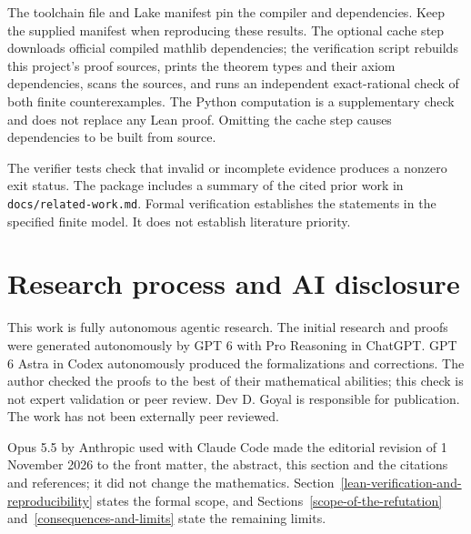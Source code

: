\documentclass[
  american,
  11pt,
]{article}
\begin{document}
The toolchain file and Lake manifest pin the compiler and dependencies.
Keep the supplied manifest when reproducing these results. The optional
cache step downloads official compiled mathlib dependencies; the
verification script rebuilds this project's proof sources, prints the
theorem types and their axiom dependencies, scans the sources, and runs
an independent exact-rational check of both finite counterexamples. The
Python computation is a supplementary check and does not replace any
Lean proof. Omitting the cache step causes dependencies to be built from
source.

The verifier tests check that invalid or incomplete evidence produces a
nonzero exit status. The package includes a summary of the cited prior
work in \texttt{docs/related-work.md}. Formal verification establishes
the statements in the specified finite model. It does not establish
literature priority.

\section{Research process and AI disclosure}\label{research-process-and-ai-disclosure}

This work is fully autonomous agentic research. The initial research and
proofs were generated autonomously by GPT 6 with Pro Reasoning in ChatGPT.
GPT 6 Astra in Codex autonomously produced the formalizations and
corrections. The author checked the proofs to the best of their
mathematical abilities; this check is not expert validation or peer review.
Dev D. Goyal is responsible for publication. The work has not been
externally peer reviewed.

Opus 5.5 by Anthropic used with Claude Code made the editorial revision of
1 November 2026 to the front matter, the abstract, this section and the
citations and references; it did not change the mathematics.
Section~\ref{lean-verification-and-reproducibility} states the formal
scope, and Sections~\ref{scope-of-the-refutation}
and~\ref{consequences-and-limits} state the remaining limits.
\end{document}
